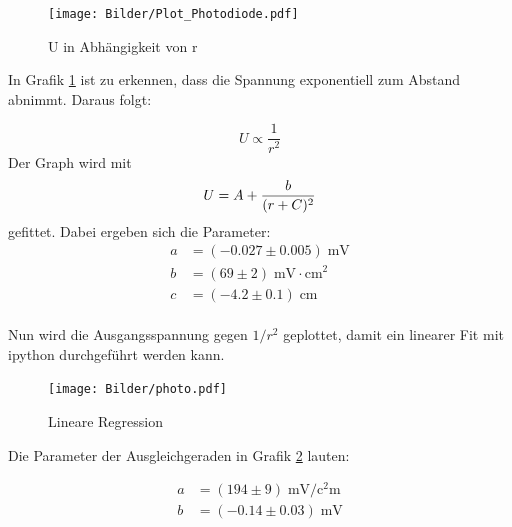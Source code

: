 \begin{figure}[H]
  \centering
  \texttt{[image: Bilder/Plot\_Photodiode.pdf]}
  \caption{U in Abhängigkeit von r}
  \label{fig:led}
\end{figure}

In Grafik \ref{fig:led} ist zu erkennen, dass die Spannung exponentiell zum Abstand
abnimmt. Daraus folgt:

\begin{equation*}
  U \propto \frac{1}{r^2}
\end{equation*}
Der Graph wird mit
\begin{equation}
U = A + \frac{b}{(r+C)^2} \notag
\end{equation}
gefittet.
Dabei ergeben sich die Parameter:
\begin{align*}
  a &= (-0.027 ± 0.005) \; \si{\milli\volt} \\
  b &= (69 ± 2)    \;   \si{\milli\volt\cdot\centi\square\meter}        \\
  c &= (-4.2 ± 0.1) \; \si{\centi\meter}
\end{align*}
\\
Nun wird die Ausgangsspannung gegen $1/r^2$ geplottet, damit ein linearer Fit mit ipython durchgeführt
werden kann.

\begin{figure}[!h]
\centering
\texttt{[image: Bilder/photo.pdf]}
\caption{Lineare Regression}
\label{fig:lin}
\end{figure}

Die Parameter der Ausgleichgeraden in Grafik \ref{fig:lin} lauten:

\begin{align*}
    a &= (194 ± 9) \; \si{\milli\volt\per\square\centi\meter} \\
    b &= (-0.14 ± 0.03) \; \si{\milli\volt}
\end{align*}
